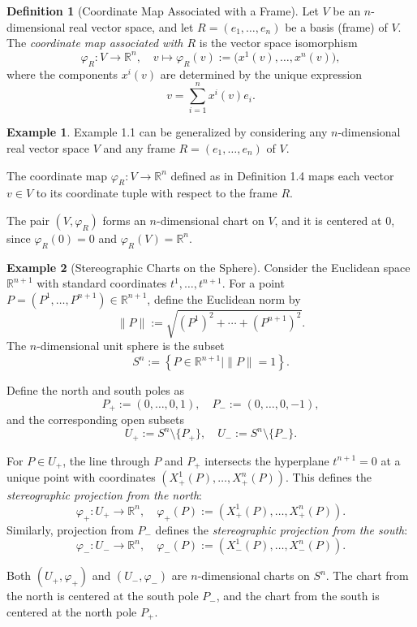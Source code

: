 \documentclass[12pt]{article}
\theoremstyle{definition}
\newtheorem{definition}{Definition}[section]
\newtheorem{example}{Example}[section]
\begin{document}
\medskip
\begin{definition}[Coordinate Map Associated with a Frame]
Let $V$ be an $n$-dimensional real vector space, and let $R = (e_1, \ldots, e_n)$ be a basis (frame) of $V$. The \emph{coordinate map associated with $R$} is the vector space isomorphism
\[
\varphi_R : V \to \mathbb{R}^n, \quad v \mapsto \varphi_R(v) := \big(x^1(v), \ldots, x^n(v)\big),
\]
where the components $x^i(v)$ are determined by the unique expression
\[
v = \sum_{i=1}^n x^i(v) e_i.
\]
\end{definition}

\medskip
\begin{example}
Example 1.1 can be generalized by considering any $n$-dimensional real vector space $V$ and any frame $R = (e_1, \ldots, e_n)$ of $V$.

The coordinate map $\varphi_R : V \to \mathbb{R}^n$ defined as in Definition 1.4 maps each vector $v \in V$ to its coordinate tuple with respect to the frame $R$.

The pair $(V, \varphi_R)$ forms an $n$-dimensional chart on $V$, and it is centered at $0$, since $\varphi_R(0) = 0$ and $\varphi_R(V) = \mathbb{R}^n$.
\end{example}

\medskip
\begin{example}[Stereographic Charts on the Sphere]
Consider the Euclidean space $\mathbb{R}^{n+1}$ with standard coordinates $t^1, \ldots, t^{n+1}$. For a point $P = (P^1, \ldots, P^{n+1}) \in \mathbb{R}^{n+1}$, define the Euclidean norm by
\[
\|P\| := \sqrt{(P^1)^2 + \cdots + (P^{n+1})^2}.
\]
The $n$-dimensional unit sphere is the subset
\[
S^n := \left\{ P \in \mathbb{R}^{n+1} \mid \|P\| = 1 \right\}.
\]

Define the north and south poles as
\[
P_+ := (0, \ldots, 0, 1), \quad P_- := (0, \ldots, 0, -1),
\]
and the corresponding open subsets
\[
U_+ := S^n \setminus \{P_+\}, \quad U_- := S^n \setminus \{P_-\}.
\]

For $P \in U_+$, the line through $P$ and $P_+$ intersects the hyperplane $t^{n+1} = 0$ at a unique point with coordinates $(X^1_+(P), \ldots, X^n_+(P))$. This defines the \emph{stereographic projection from the north}:
\[
\varphi_+ : U_+ \to \mathbb{R}^n, \quad \varphi_+(P) := (X^1_+(P), \ldots, X^n_+(P)).
\]
Similarly, projection from $P_-$ defines the \emph{stereographic projection from the south}:
\[
\varphi_- : U_- \to \mathbb{R}^n, \quad \varphi_-(P) := (X^1_-(P), \ldots, X^n_-(P)).
\]

Both $(U_+, \varphi_+)$ and $(U_-, \varphi_-)$ are $n$-dimensional charts on $S^n$. The chart from the north is centered at the south pole $P_-$, and the chart from the south is centered at the north pole $P_+$.
\end{example}
\end{document}
